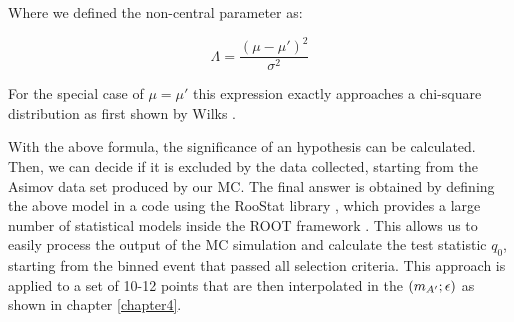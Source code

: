 Where we defined the non-central parameter as:

\begin{equation}
  \label{eq:non-central-par}
  \Lambda = \frac{(\mu - \mu')^2}{\sigma^2}
\end{equation}

For the special case of $\mu = \mu'$ this expression exactly approaches a chi-square distribution as first shown by Wilks \cite{10.2307/2957648}. 

With the above formula, the significance of an hypothesis can be calculated. Then, we can decide if it is excluded by the data collected, starting from the Asimov data set produced by our MC. The final answer is obtained by defining the above model in a code using the RooStat library \cite{moneta2010roostats}, which provides a large number of statistical models inside the ROOT framework \cite{root}. This allows us to easily process the output of the MC simulation and calculate the test statistic $q_0$, starting from the binned event that passed all selection criteria. This approach is applied to a set of 10-12 points that are then interpolated in the $(m_{A'};\epsilon)$ as shown in chapter \ref{chapter4}.
